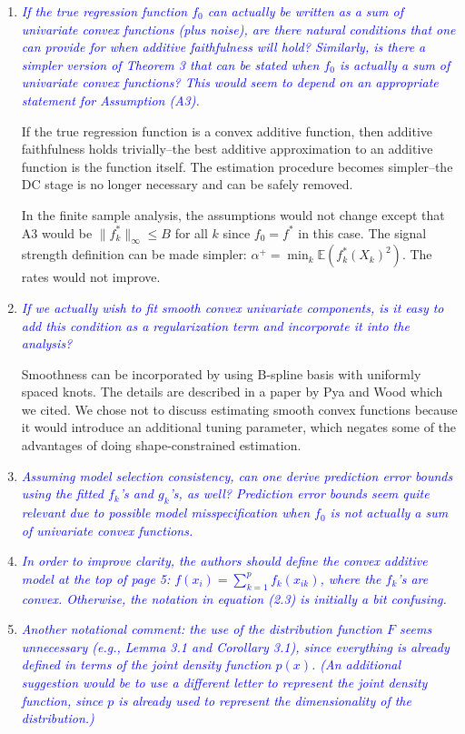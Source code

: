 \documentclass[pdftex,12pt]{article}
\def\rc#1{{\it\textcolor{blue}{#1}}\smallskip}
\begin{document}
\begin{enumerate}[(1)]
\item \rc{If the true regression function $f_0$ can actually be written as a
sum of univariate convex functions (plus noise), are there natural
conditions that one can provide for when additive faithfulness will
hold? Similarly, is there a simpler version of Theorem 3 that can be
stated when $f_0$ is actually a sum of univariate convex functions? This
would seem to depend on an appropriate statement for Assumption (A3).}

If the true regression function is a convex additive function, then additive faithfulness holds trivially--the best additive approximation to an additive function is the function itself. The estimation procedure becomes simpler--the DC stage is no longer necessary and can be safely removed. 

In the finite sample analysis, the assumptions would not change except that A3 would be $\| f^*_k \|_\infty \leq B$ for all $k$ since $f_0 = f^*$ in this case. The signal strength definition can be made simpler: $\alpha^+ = \min_k \mathbb{E}( f^*_k(X_k)^2 )$. The rates would not improve.


\item \rc{If we actually wish to fit smooth convex univariate components, is
it easy to add this condition as a regularization term and incorporate
it into the analysis?}

Smoothness can be incorporated by using B-spline basis with uniformly spaced knots. The details are described in a paper by Pya and Wood which we cited. We chose not to discuss estimating smooth convex functions because it would introduce an additional tuning parameter, which negates some of the advantages of doing shape-constrained estimation.

\item \rc{Assuming model selection consistency, can one derive prediction
error bounds using the fitted $f_k$'s and $g_k$'s, as well? Prediction error
bounds seem quite relevant due to possible model misspecification when
$f_0$ is not actually a sum of univariate convex functions.}

\item \rc{In order to improve clarity, the authors should define the convex
additive model at the top of page 5: $f(x_i) = \sum_{k=1}^p f_k(x_{ik})$, where the
$f_k$'s are convex.  Otherwise, the notation in equation (2.3) is
initially a bit confusing.}

\item \rc{Another notational comment: the use of the
distribution function $F$ seems unnecessary (e.g., Lemma 3.1 and
Corollary 3.1), since everything is already defined in terms of the
joint density function $p(x)$. (An additional suggestion would be to use
a different letter to represent the joint density function, since $p$ is
already used to represent the dimensionality of the distribution.)}


\end{enumerate}
\end{document}
